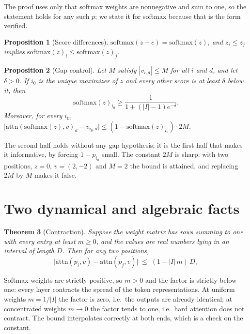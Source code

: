 \documentclass[11pt]{article}
\newtheorem{theorem}{Theorem}
\newtheorem{proposition}[theorem]{Proposition}
\begin{document}
The proof uses only that softmax weights are nonnegative and sum to one, so the
statement holds for any such $p$; we state it for softmax because that is the
form verified.

\begin{proposition}[Score differences]\label{prop:diff}
$\mathrm{softmax}(z + c) = \mathrm{softmax}(z)$, and $z_i \le z_j$ implies
$\mathrm{softmax}(z)_i \le \mathrm{softmax}(z)_j$.
\end{proposition}

\begin{proposition}[Gap control]\label{prop:gap}
Let $M$ satisfy $|v_{i,d}| \le M$ for all $i$ and $d$, and let $\delta > 0$. If $i_0$ is the unique
maximizer of $z$ and every other score is at least $\delta$ below it, then
\[
  \mathrm{softmax}(z)_{i_0} \ge \frac{1}{1 + (|I|-1)e^{-\delta}} .
\]
Moreover, for \emph{every} $i_0$,
$\bigl|\mathrm{attn}(\mathrm{softmax}(z),v)_d - v_{i_0,d}\bigr| \le
(1 - \mathrm{softmax}(z)_{i_0}) \cdot 2M$.
\end{proposition}

The second half holds without any gap hypothesis; it is the first half that
makes it informative, by forcing $1 - p_{i_0}$ small. The constant $2M$ is
sharp: with two positions, $z = 0$, $v = (2,-2)$ and $M = 2$ the bound is
attained, and replacing $2M$ by $M$ makes it false.

\section{Two dynamical and algebraic facts}\label{sec:dynamic}

\begin{theorem}[Contraction]\label{thm:contract}
Suppose the weight matrix has rows summing to one with every entry at least
$m \ge 0$, and the values are real numbers lying in an interval of length $D$.
Then for any two positions,
\[
  \bigl|\mathrm{attn}(p_i, v) - \mathrm{attn}(p_j, v)\bigr|
  \;\le\; (1 - |I|\,m)\, D ,
\]
\end{theorem}

Softmax weights are strictly positive, so $m > 0$ and the factor is strictly
below one: every layer contracts the spread of the token representations. At
uniform weights $m = 1/|I|$ the factor is zero, i.e.\ the outputs are already
identical; at concentrated weights $m \to 0$ the factor tends to one, i.e.\
hard attention does not contract. The bound interpolates correctly at both ends,
which is a check on the constant.
\end{document}
